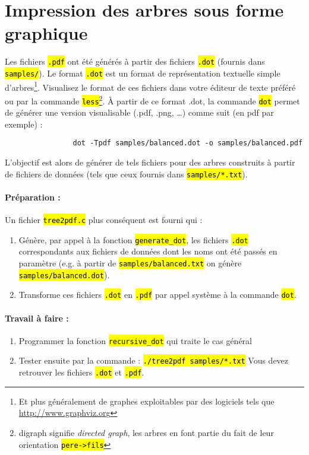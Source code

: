 \documentclass[final, a4paper, openbib, ]{article}
\let\OldTexttt\texttt
\renewcommand{\texttt}[1]{\OldTexttt{\hl{#1}}}
\begin{document}
\section{Impression des arbres sous forme graphique}
Les fichiers \texttt{.pdf} ont été générés à partir des fichiers \texttt{.dot} (fournis dans \texttt{samples/}).
Le format \texttt{.dot} est un format de représentation textuelle simple d'arbres\footnote{Et plus généralement de graphes exploitables par des logiciels tels que \url{http://www.graphviz.org}}.
Visualisez le format de ces fichiers dans votre éditeur de texte préféré ou par la commande \texttt{less}\footnote{digraph signifie \textit{directed graph}, les arbres en font partie du fait de leur orientation \texttt{pere->fils}}.
À partir de ce format .dot, la commande \texttt{dot} permet de générer une version visualisable (.pdf, .png, \ldots) comme suit (en pdf par exemple) :

\begin{verbatim}
				dot -Tpdf samples/balanced.dot -o samples/balanced.pdf
\end{verbatim}

L'objectif est alors de générer de tels fichiers pour des arbres construits à partir de fichiers de données (tels que ceux fournis dans \texttt{samples/*.txt}).
					
\paragraph{Préparation :} Un fichier \texttt{tree2pdf.c} plus conséquent est fourni qui :
\begin{enumerate}
	\item Génère, par appel à la fonction \texttt{generate\_dot}, les fichiers \texttt{.dot} correspondants aux fichiers de données dont les noms ont été passés en paramètre (e.g. à partir de \texttt{samples/balanced.txt} on génère \texttt{samples/balanced.dot}).
	\item Transforme ces fichiers \texttt{.dot} en \texttt{.pdf} par appel système à la commande \texttt{dot}.
\end{enumerate}

\paragraph{Travail à faire :}
\begin{enumerate}
	\item Programmer la fonction \texttt{recursive\_dot} qui traite le cas général
	\item Tester ensuite par la commande : \texttt{./tree2pdf samples/*.txt}
Vous devez retrouver les fichiers \texttt{.dot} et \texttt{.pdf}.
\end{enumerate}
\end{document}
